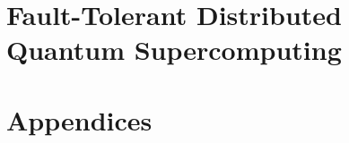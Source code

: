 \documentclass[11pt,twoside,openright,a4paper]{book}
\begin{document}
\part{Fault-Tolerant Distributed Quantum Supercomputing}




\appendix
\part*{Appendices}






\backmatter



\end{document}
